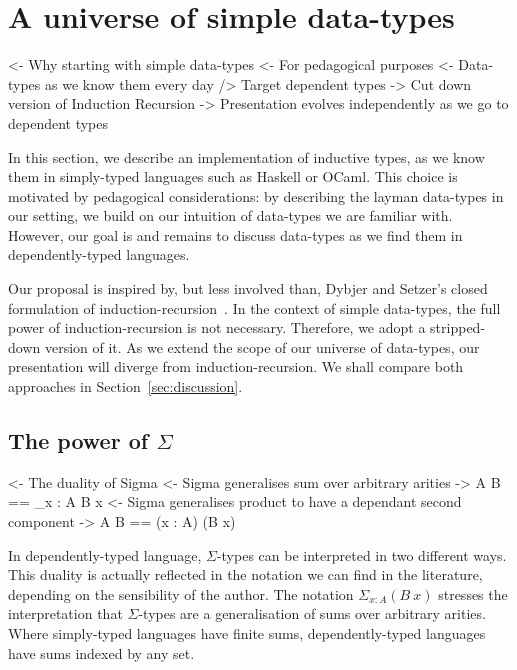 \section{A universe of simple data-types}
\label{sec:universe-desc}

\begin{wstructure}
<- Why starting with simple data-types
    <- For pedagogical purposes
        <- Data-types as we know them every day
        /> Target dependent types
    -> Cut down version of Induction Recursion
        -> Presentation evolves independently as we go to dependent types
\end{wstructure}

In this section, we describe an implementation of inductive types, as
we know them in simply-typed languages such as Haskell or OCaml. This
choice is motivated by pedagogical considerations: by describing the
layman data-types in our setting, we build on our intuition of
data-types we are familiar with. However, our goal is and remains to
discuss data-types as we find them in dependently-typed languages.

Our proposal is inspired by, but less involved than, Dybjer and
Setzer's closed formulation of
induction-recursion~\cite{dybjer:general-ir, dybjer:axiom-ir,
  dybjer:ir-initial-algebra, dybjer:iir}. In the context of simple
data-types, the full power of induction-recursion is not
necessary. Therefore, we adopt a stripped-down version of it. As we
extend the scope of our universe of data-types, our presentation will
diverge from induction-recursion. We shall compare both approaches in
Section~\ref{sec:discussion}.

\subsection{The power of $\Sigma$}

\begin{wstructure}
<- The duality of Sigma
    <- Sigma generalises sum over arbitrary arities
        -> \Sigma A B == \Sigma_{x : A} B x
    <- Sigma generalises product to have a dependant second component
        -> \Sigma A B == (x : A) \times (B x)
\end{wstructure}

In dependently-typed language, $\Sigma$-types can be interpreted in
two different ways. This duality is actually reflected in the notation
we can find in the literature, depending on the sensibility of the author.
The notation $\Sigma_{x : A} (B\: x)$ stresses the interpretation that
$\Sigma$-types are a generalisation of sums over arbitrary arities.  Where
simply-typed languages have finite sums, dependently-typed languages have
sums indexed by any set.

